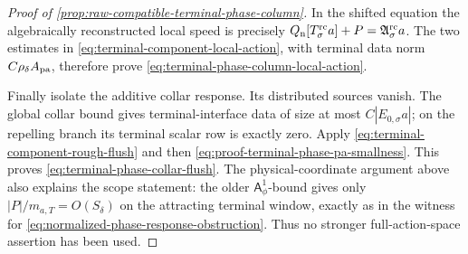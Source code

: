\begin{proof}[Proof of
\cref{prop:raw-compatible-terminal-phase-column}]
In the shifted equation the algebraically reconstructed local speed is
precisely
\(Q_{\rm n}[T_\sigma^{\rm rc}a]+P
 =\mathfrak A_\sigma^{\rm rc}a\).
The two estimates in
\cref{eq:terminal-component-local-action}, with terminal data norm
\(C\rho_\delta A_{\rm pa}\), therefore prove
\cref{eq:terminal-phase-column-local-action}.

Finally isolate the additive collar response.  Its distributed sources
vanish.  The global collar bound gives terminal-interface data of size
at most \(C|E_{0,\sigma}a|\); on the repelling branch its terminal scalar
row is exactly zero.  Apply
\cref{eq:terminal-component-rough-flush} and then
\cref{eq:proof-terminal-phase-pa-smallness}.  This proves
\cref{eq:terminal-phase-collar-flush}.  The physical-coordinate argument
above also explains the scope statement: the older
\(\mathsf A_\phi^1\)-bound gives only
\(|P|/m_{a,T}=O(S_\delta)\) on the attracting terminal window, exactly as
in the witness for
\cref{eq:normalized-phase-response-obstruction}.  Thus no stronger
full-action-space assertion has been used.
\end{proof}

